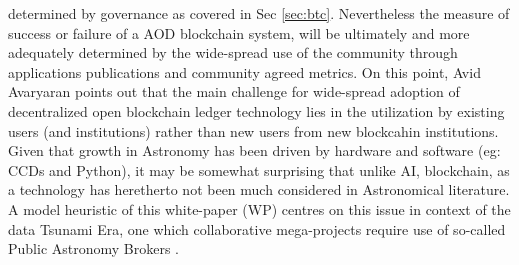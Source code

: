 \documentclass[final,5p,times,twocolumn,authoryear]{elsarticle}
\begin{document}
determined by governance as covered in Sec \ref{sec:btc}. Nevertheless the measure of success or failure of a AOD blockchain system, will be ultimately and more adequately determined by the wide-spread use of the community through applications publications and community agreed metrics. On this point, Avid Avaryaran points out that the main challenge for wide-spread adoption of decentralized open blockchain ledger technology lies in the utilization by existing users (and institutions) rather than new users from new blockcahin institutions. Given that growth in Astronomy has been driven by hardware and software (eg: CCDs and Python), it may be somewhat surprising that unlike AI, blockchain, as a technology has heretherto not been much considered in Astronomical literature.  A model heuristic of this white-paper (WP) centres on this issue in context of the data Tsunami Era, one which collaborative mega-projects require use of so-called Public Astronomy Brokers \cite{bellm19}.  


\end{document}
